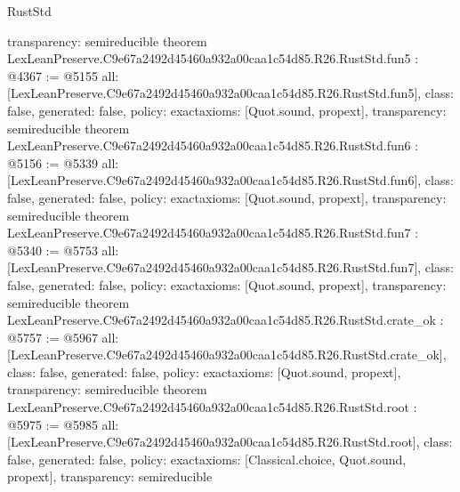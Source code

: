 \begin{lexlean}{RustStd}
\begin{coremodule}
{  transparency: semireducible
}
theorem LexLeanPreserve.C9e67a2492d45460a932a00caa1c54d85.R26.RustStd.fun5 : @4367 := @5155 {
  all: [LexLeanPreserve.C9e67a2492d45460a932a00caa1c54d85.R26.RustStd.fun5],
  class: false,
  generated: false,
  policy: exact{axioms: [Quot.sound, propext]},
  transparency: semireducible
}
theorem LexLeanPreserve.C9e67a2492d45460a932a00caa1c54d85.R26.RustStd.fun6 : @5156 := @5339 {
  all: [LexLeanPreserve.C9e67a2492d45460a932a00caa1c54d85.R26.RustStd.fun6],
  class: false,
  generated: false,
  policy: exact{axioms: [Quot.sound, propext]},
  transparency: semireducible
}
theorem LexLeanPreserve.C9e67a2492d45460a932a00caa1c54d85.R26.RustStd.fun7 : @5340 := @5753 {
  all: [LexLeanPreserve.C9e67a2492d45460a932a00caa1c54d85.R26.RustStd.fun7],
  class: false,
  generated: false,
  policy: exact{axioms: [Quot.sound, propext]},
  transparency: semireducible
}
theorem LexLeanPreserve.C9e67a2492d45460a932a00caa1c54d85.R26.RustStd.crate_ok : @5757 := @5967 {
  all: [LexLeanPreserve.C9e67a2492d45460a932a00caa1c54d85.R26.RustStd.crate_ok],
  class: false,
  generated: false,
  policy: exact{axioms: [Quot.sound, propext]},
  transparency: semireducible
}
theorem LexLeanPreserve.C9e67a2492d45460a932a00caa1c54d85.R26.RustStd.root : @5975 := @5985 {
  all: [LexLeanPreserve.C9e67a2492d45460a932a00caa1c54d85.R26.RustStd.root],
  class: false,
  generated: false,
  policy: exact{axioms: [Classical.choice, Quot.sound, propext]},
  transparency: semireducible
}


\end{coremodule}
\end{lexlean}
